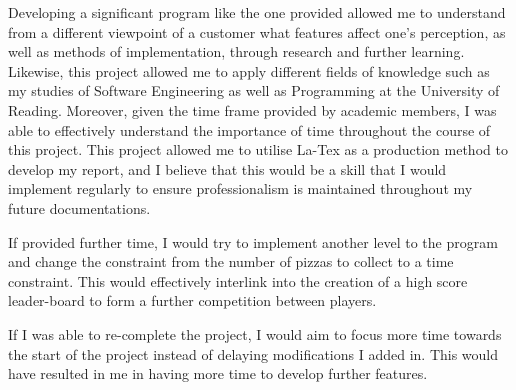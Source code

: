 \documentclass{article}
\begin{document}
Developing a significant program like the one provided allowed me to understand from a different viewpoint of a customer what features affect one's perception, as well as methods of implementation, through research and further learning. Likewise, this project allowed me to apply different fields of knowledge such as my studies of Software Engineering as well as Programming at the University of Reading. Moreover, given the time frame provided by academic members, I was able to effectively understand the importance of time throughout the course of this project. This project allowed me to utilise La-Tex as a production method to develop my report, and I believe that this would be a skill that I would implement regularly to ensure professionalism is maintained throughout my future documentations.

If provided further time, I would try to implement another level to the program and change the constraint from the number of pizzas to collect to a time constraint. This would effectively interlink into the creation of a high score leader-board to form a further competition between players.

If I was able to re-complete the project, I would aim to focus more time towards the start of the project instead of delaying modifications I added in. This would have resulted in me in having more time to develop further features.

\cleardoublepage
\end{document}

